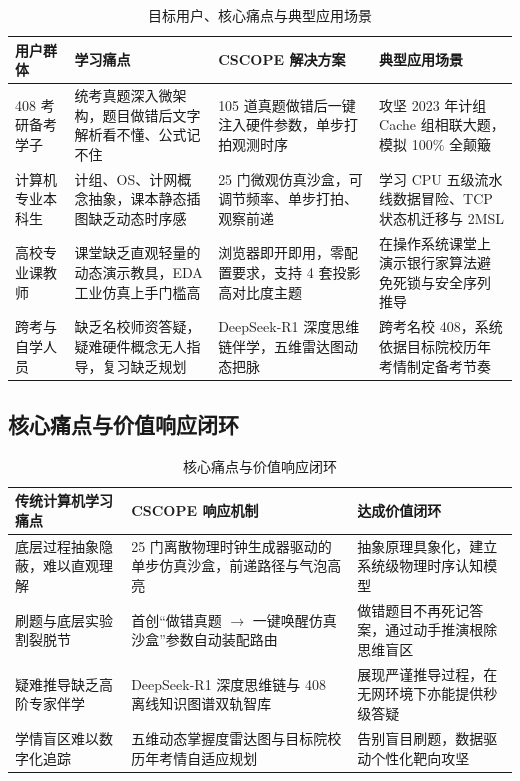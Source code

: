 \documentclass[UTF8,a4paper,11pt]{ctexart}
\begin{document}
\begin{table}[htbp]
\centering
\small
\caption{目标用户、核心痛点与典型应用场景}
\begin{tabularx}{\textwidth}{p{2.5cm}Xp{3.5cm}p{3.5cm}}
\toprule
\textbf{用户群体} & \textbf{学习痛点} & \textbf{CSCOPE 解决方案} & \textbf{典型应用场景} \\
\midrule
408 考研备考学子 & 统考真题深入微架构，题目做错后文字解析看不懂、公式记不住 & 105 道真题做错后一键注入硬件参数，单步打拍观测时序 & 攻坚 2023 年计组 Cache 组相联大题，模拟 100\% 全颠簸 \\
计算机专业本科生 & 计组、OS、计网概念抽象，课本静态插图缺乏动态时序感 & 25 门微观仿真沙盒，可调节频率、单步打拍、观察前递 & 学习 CPU 五级流水线数据冒险、TCP 状态机迁移与 2MSL \\
高校专业课教师 & 课堂缺乏直观轻量的动态演示教具，EDA 工业仿真上手门槛高 & 浏览器即开即用，零配置要求，支持 4 套投影高对比度主题 & 在操作系统课堂上演示银行家算法避免死锁与安全序列推导 \\
跨考与自学人员 & 缺乏名校师资答疑，疑难硬件概念无人指导，复习缺乏规划 & DeepSeek-R1 深度思维链伴学，五维雷达图动态把脉 & 跨考名校 408，系统依据目标院校历年考情制定备考节奏 \\
\bottomrule
\end{tabularx}
\end{table}

\subsection{核心痛点与价值响应闭环}

\begin{table}[htbp]
\centering
\small
\caption{核心痛点与价值响应闭环}
\begin{tabularx}{\textwidth}{p{3.5cm}Xp{4.5cm}}
\toprule
\textbf{传统计算机学习痛点} & \textbf{CSCOPE 响应机制} & \textbf{达成价值闭环} \\
\midrule
底层过程抽象隐蔽，难以直观理解 & 25 门离散物理时钟生成器驱动的单步仿真沙盒，前递路径与气泡高亮 & 抽象原理具象化，建立系统级物理时序认知模型 \\
刷题与底层实验割裂脱节 & 首创“做错真题 $\rightarrow$ 一键唤醒仿真沙盒”参数自动装配路由 & 做错题目不再死记答案，通过动手推演根除思维盲区 \\
疑难推导缺乏高阶专家伴学 & DeepSeek-R1 深度思维链与 408 离线知识图谱双轨智库 & 展现严谨推导过程，在无网环境下亦能提供秒级答疑 \\
学情盲区难以数字化追踪 & 五维动态掌握度雷达图与目标院校历年考情自适应规划 & 告别盲目刷题，数据驱动个性化靶向攻坚 \\
\bottomrule
\end{tabularx}
\end{table}
\end{document}

